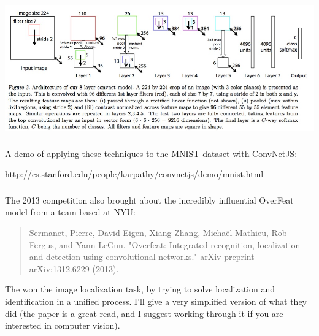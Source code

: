 \documentclass[xetex,mathserif,serif,aspectratio=169]{beamer}
\begin{document}
\begin{frame}[fragile] \frametitle{} \oldB \small

\begin{center}
\includegraphics[width=\textwidth]{img/vizModel.jpg}
\end{center}

\end{frame}

\begin{frame}[fragile] \frametitle{} \oldB \small

A demo of applying these techniques to the MNIST dataset with ConvNetJS:

\begin{center}
\url{http://cs.stanford.edu/people/karpathy/convnetjs/demo/mnist.html}
\end{center}

\end{frame}

\begin{frame}[fragile] \frametitle{} \oldB \small


The 2013 competition also brought about the incredibly influential
OverFeat model from a team based at NYU:
\begin{quote}
Sermanet, Pierre, David Eigen, Xiang Zhang, Michaël Mathieu, Rob Fergus, and Yann LeCun. "Overfeat: Integrated recognition, localization and detection using convolutional networks." arXiv preprint arXiv:1312.6229 (2013).
\end{quote}
The won the image localization task, by trying to solve localization
and identification in a unified process. I'll give a very simplified
version of what they did (the paper is a great read, and I suggest
working through it if you are interested in computer vision).

\end{frame}
\end{document}
